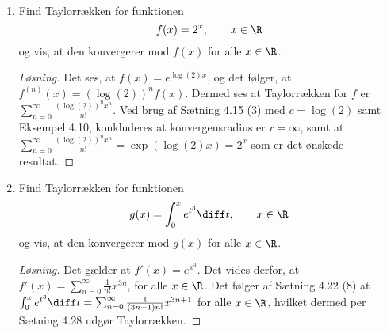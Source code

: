 \begin{opg}\hfill \\
		\begin{enumerate}
			\item Find Taylorrækken for funktionen $$ f(x)=2^x,\qquad   x\in\R $$ 
			og vis, at den konvergerer mod $ f(x) $ for alle $ x\in \R $.
			\ifanswers
			\begin{proof}[Løsning]
				Det ses, at $ f(x)=e^{\log(2)x} $, og det følger, at $ f^{(n)}(x)=\left(\log(2)\right)^nf(x) $. Dermed ses at Taylorrækken for $ f $ er $ \sum_{n=0}^{\infty}\frac{\left(\log(2)\right)^nx^n}{n!} $. Ved brug af Sætning 4.15 (3) med $ c=\log(2) $ samt Eksempel 4.10, konkluderes at konvergensradius er $ r=\infty $, samt at $ \sum_{n=0}^{\infty}\frac{\left(\log(2)\right)^nx^n}{n!}=\exp(\log(2)x)=2^x $ som er det ønskede resultat.
				
				
			\end{proof}
			\fi
				\item Find Taylorrækken for funktionen $$ g(x)=\int_{0}^{x}e^{t^3}\diff t,\qquad   x\in\R $$ 
				og vis, at den konvergerer mod $ g(x) $ for alle $ x\in \R $.
				\ifanswers
				\begin{proof}[Løsning]
				Det gælder at $ f'(x)=e^{x^3} $. Det vides derfor, at $ f'(x)=\sum_{n=0}^{\infty}\frac{1}{n!}x^{3n} $, for alle $ x\in\R $. Det følger af Sætning 4.22 (8) at $ \int_{0}^{x}e^{t^3}\diff t=\sum_{n=0}^{\infty}\frac{1}{(3n+1)n!}x^{3n+1} $ for alle $ x\in \R $, hvilket dermed per Sætning 4.28 udgør Taylorrækken.
				\end{proof}
				\fi
		\end{enumerate}
	\end{opg}


